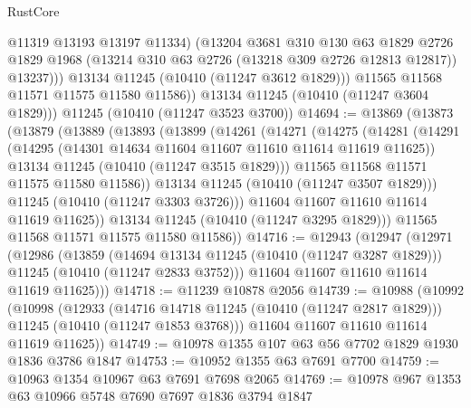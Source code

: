\begin{lexlean}{RustCore}
\begin{coremodule}
                  @11319
                  @13193
                  @13197
                  @11334)
                (@13204
                  @3681
                  @310
                  @130
                  @63
                  @1829
                  @2726
                  @1829
                  @1968
                  (@13214 @310 @63 @2726 (@13218 @309 @2726 @12813 @12817))
                  @13237)))
            @13134
            @11245
            (@10410 (@11247 @3612 @1829)))
          @11565
          @11568
          @11571
          @11575
          @11580
          @11586))
      @13134
      @11245
      (@10410 (@11247 @3604 @1829)))
    @11245
    (@10410 (@11247 @3523 @3700))
@14694 := @13869
    (@13873
      (@13879
        (@13889
          (@13893
            (@13899
              (@14261
                (@14271
                  (@14275
                    (@14281
                      (@14291
                        (@14295 (@14301 @14634 @11604 @11607 @11610 @11614 @11619 @11625))
                        @13134
                        @11245
                        (@10410 (@11247 @3515 @1829)))
                      @11565
                      @11568
                      @11571
                      @11575
                      @11580
                      @11586))
                  @13134
                  @11245
                  (@10410 (@11247 @3507 @1829)))
                @11245
                (@10410 (@11247 @3303 @3726)))
              @11604
              @11607
              @11610
              @11614
              @11619
              @11625))
          @13134
          @11245
          (@10410 (@11247 @3295 @1829)))
        @11565
        @11568
        @11571
        @11575
        @11580
        @11586))
@14716 := @12943
    (@12947
      (@12971
        (@12986
          (@13859
            (@14694 @13134 @11245 (@10410 (@11247 @3287 @1829)))
            @11245
            (@10410 (@11247 @2833 @3752)))
          @11604
          @11607
          @11610
          @11614
          @11619
          @11625)))
@14718 := @11239 @10878 @2056
@14739 := @10988
    (@10992
      (@10998
        (@12933
          (@14716 @14718 @11245 (@10410 (@11247 @2817 @1829)))
          @11245
          (@10410 (@11247 @1853 @3768)))
        @11604
        @11607
        @11610
        @11614
        @11619
        @11625))
@14749 := @10978 @1355 @107 @63 @56 @7702 @1829 @1930 @1836 @3786 @1847
@14753 := @10952 @1355 @63 @7691 @7700
@14759 := @10963 @1354 @10967 @63 @7691 @7698 @2065
@14769 := @10978 @967 @1353 @63 @10966 @5748 @7690 @7697 @1836 @3794 @1847

\end{coremodule}
\end{lexlean}
